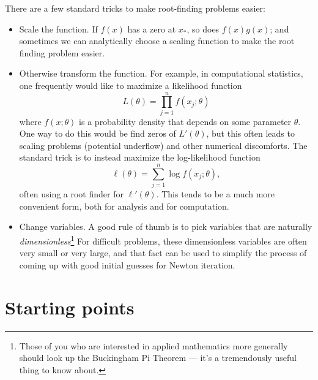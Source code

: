 \documentclass[12pt, leqno]{article}
\begin{document}
There are a few standard tricks to make root-finding problems easier:
\begin{itemize}
\item
  Scale the function.  If $f(x)$ has a zero at $x_*$, so does $f(x)
  g(x)$; and sometimes we can analytically choose a scaling function
  to make the root finding problem easier.
\item
  Otherwise transform the function.  For example, in computational
  statistics, one frequently would like to maximize a likelihood function
  \[
    L(\theta) = \prod_{j=1}^n f(x_j; \theta)
  \]
  where $f(x; \theta)$ is a probability density that depends on some
  parameter $\theta$.  One way to do this would be find zeros of
  $L'(\theta)$, but this often leads to scaling problems (potential
  underflow) and other numerical discomforts.  The standard trick is
  to instead maximize the log-likelihood function
  \[
    \ell(\theta) = \sum_{j=1}^n \log f(x_j; \theta),
  \]
  often using a root finder for $\ell'(\theta)$.  This tends to be a
  much more convenient form, both for analysis and for computation.
\item
  Change variables.  A good rule of thumb is to pick variables that
  are naturally {\em dimensionless}\footnote{%
Those of you who are interested in applied mathematics more generally
should look up the Buckingham Pi Theorem --- it's a tremendously
useful thing to know about.
}
  For difficult problems, these dimensionless variables are often very
  small or very large, and that fact can be used to simplify the
  process of coming up with good initial guesses for Newton iteration.
\end{itemize}

\section*{Starting points}

\end{document}
